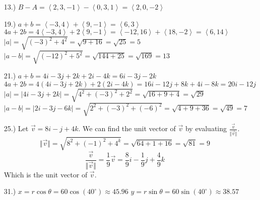 \documentclass[12pt]{article}
\newcommand{\angleb}[1]{\left\langle#1\right\rangle}
\newcommand{\vertb}[1]{\left\vert#1\right\vert}
\begin{document}
\begin{itemize}
    \item [13.)] $B-A=\left\langle2,3,-1\right\rangle-\left\langle0,3,1\right\rangle=\left\langle2,0,-2\right\rangle$


    \item [19.)] $a+b=\angleb{-3,4}+\angleb{9,-1}=\angleb{6,3}$\newline
    $4a+2b=4\angleb{-3,4}+2\angleb{9,-1}=\angleb{-12,16}+\angleb{18,-2}=\angleb{6,14}$\newline
    $\vertb{a}=\sqrt{(-3)^2+4^2}=\sqrt{9+16}=\sqrt{25}=5$\newline
    $\vertb{a-b}=\sqrt{(-12)^2+5^2}=\sqrt{144+25}=\sqrt{169}=13$

    \item [21.)] $a+b=4i-3j+2k+2i-4k=6i-3j-2k$\newline
    $4a+2b=4(4i-3j+2k)+2(2i-4k)=16i-12j+8k+4i-8k=20i-12j$\newline
    $\vertb{a}=\vertb{4i-3j+2k}=\sqrt{4^2+(-3)^2+2^2}=\sqrt{16+9+4}=\sqrt{29}$\newline
    $\vertb{a-b}=\vertb{2i-3j-6k}=\sqrt{2^2+(-3)^2+(-6)^2}=\sqrt{4+9+36}=\sqrt{49}=7$

    \pagebreak
    \item [25.)] Let $\vec{v}=8i-j+4k$. We can find the unit vector of $\vec{v}$ by evaluating $\frac{\vec{v}}{\Vert\vec{v}\Vert}$.
    \begin{equation*}
        \Vert\vec{v}\Vert=\sqrt{8^2+(-1)^2+4^k}=\sqrt{64+1+16}=\sqrt{81}=9
    \end{equation*}
    \begin{equation*}
        \frac{\vec{v}}{\Vert\vec{v}\Vert}=\frac{1}{9}\vec{v}=\frac{8}{9}i-\frac{1}{9}j+\frac{4}{9}k
    \end{equation*}
    Which is the unit vector of $\vec{v}$.

    \item [31.)] $x=r\cos\theta=60\cos(40^\circ)\approx45.96$\newline
    $y=r\sin\theta=60\sin(40^\circ)\approx38.57$
\end{itemize}
\end{document}
